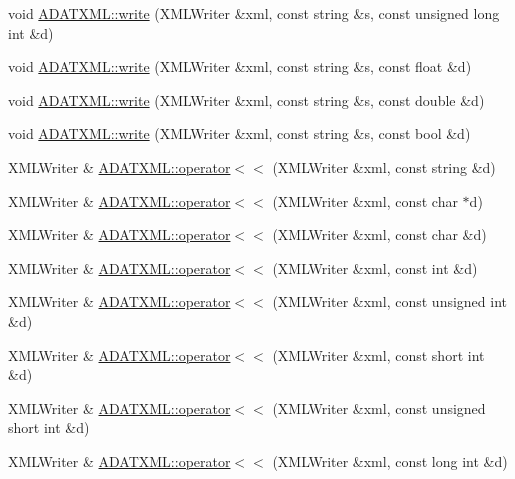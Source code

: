 \begin{DoxyCompactItemize}
\item 
void \mbox{\hyperlink{namespaceADATXML_a578f900bd955ac5e0634cab05b971100}{A\+D\+A\+T\+X\+M\+L\+::write}} (X\+M\+L\+Writer \&xml, const string \&s, const unsigned long int \&d)
\item 
void \mbox{\hyperlink{namespaceADATXML_a035a5eef9aec1745474937a355e7813b}{A\+D\+A\+T\+X\+M\+L\+::write}} (X\+M\+L\+Writer \&xml, const string \&s, const float \&d)
\item 
void \mbox{\hyperlink{namespaceADATXML_a858880833c586f87f16f2f3022243c16}{A\+D\+A\+T\+X\+M\+L\+::write}} (X\+M\+L\+Writer \&xml, const string \&s, const double \&d)
\item 
void \mbox{\hyperlink{namespaceADATXML_af41b23f17b1b37465f4c3ca3a115e87a}{A\+D\+A\+T\+X\+M\+L\+::write}} (X\+M\+L\+Writer \&xml, const string \&s, const bool \&d)
\item 
X\+M\+L\+Writer \& \mbox{\hyperlink{namespaceADATXML_a83bf96b9b273ac7b48f1f7eef49b5390}{A\+D\+A\+T\+X\+M\+L\+::operator$<$$<$}} (X\+M\+L\+Writer \&xml, const string \&d)
\item 
X\+M\+L\+Writer \& \mbox{\hyperlink{group__io_ga1e77b0f38cdffd40d5f5d947a4527bb4}{A\+D\+A\+T\+X\+M\+L\+::operator$<$$<$}} (X\+M\+L\+Writer \&xml, const char $\ast$d)
\item 
X\+M\+L\+Writer \& \mbox{\hyperlink{group__io_gaaf7119c0afc1e8701f12daa5d349ae00}{A\+D\+A\+T\+X\+M\+L\+::operator$<$$<$}} (X\+M\+L\+Writer \&xml, const char \&d)
\item 
X\+M\+L\+Writer \& \mbox{\hyperlink{group__io_gab642b539df5696daa03675faadf87dfc}{A\+D\+A\+T\+X\+M\+L\+::operator$<$$<$}} (X\+M\+L\+Writer \&xml, const int \&d)
\item 
X\+M\+L\+Writer \& \mbox{\hyperlink{group__io_ga24986bf3413f6b83f58f5941f2c68db7}{A\+D\+A\+T\+X\+M\+L\+::operator$<$$<$}} (X\+M\+L\+Writer \&xml, const unsigned int \&d)
\item 
X\+M\+L\+Writer \& \mbox{\hyperlink{group__io_ga2892faecb11d9475723b52bcae10aa04}{A\+D\+A\+T\+X\+M\+L\+::operator$<$$<$}} (X\+M\+L\+Writer \&xml, const short int \&d)
\item 
X\+M\+L\+Writer \& \mbox{\hyperlink{group__io_gac4bf68c17fbdb50450cfa2d338d09685}{A\+D\+A\+T\+X\+M\+L\+::operator$<$$<$}} (X\+M\+L\+Writer \&xml, const unsigned short int \&d)
\item 
X\+M\+L\+Writer \& \mbox{\hyperlink{group__io_gadc0e2c541a279b5a007e13f6f73ecf45}{A\+D\+A\+T\+X\+M\+L\+::operator$<$$<$}} (X\+M\+L\+Writer \&xml, const long int \&d)
\item 

\end{DoxyCompactItemize}
